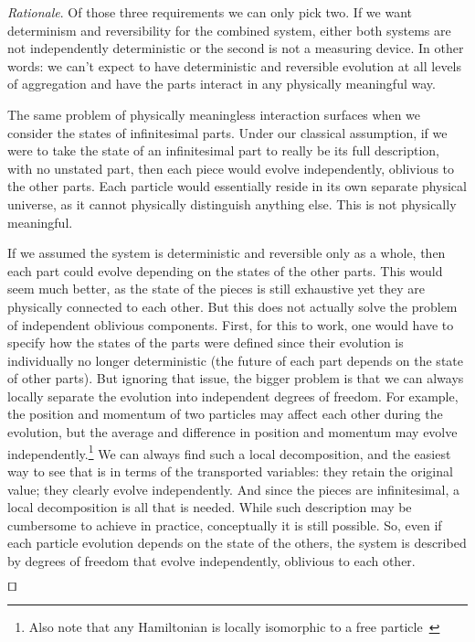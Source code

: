 \documentclass[smallextended]{svjour3}
\numberwithin{equation}{section}
\newenvironment{rationale}{\emph{Rationale}.}{\hfill\(\qed\)}
\theoremstyle{definition}
\newenvironment{rationale}{\emph{Rationale}.}{\qed}
\begin{document}
\begin{rationale}
	Of those three requirements we can only pick two. If we want determinism and reversibility for the combined system, either both systems are not independently deterministic or the second is not a measuring device. In other words: we can't expect to have deterministic and reversible evolution at all levels of aggregation and have the parts interact in any physically meaningful way.
	
	The same problem of physically meaningless interaction surfaces when we consider the states of infinitesimal parts. Under our classical assumption, if we were to take the state of an infinitesimal part to really be its full description, with no unstated part, then each piece would evolve independently, oblivious to the other parts. Each particle would essentially reside in its own separate physical universe, as it cannot physically distinguish anything else. This is not physically meaningful.
	
	If we assumed the system is deterministic and reversible only as a whole, then each part could evolve depending on the states of the other parts. This would seem much better, as the state of the pieces is still exhaustive yet they are physically connected to each other. But this does not actually solve the problem of independent oblivious components. First, for this to work, one would have to specify how the states of the parts were defined since their evolution is individually no longer deterministic (the future of each part depends on the state of other parts). But ignoring that issue, the bigger problem is that we can always locally separate the evolution into independent degrees of freedom. For example, the position and momentum of two particles may affect each other during the evolution, but the average and difference in position and momentum may evolve independently.\footnote{Also note that any Hamiltonian is locally isomorphic to a free particle~\cite{Linares}} We can always find such a local decomposition, and the easiest way to see that is in terms of the transported variables: they retain the original value; they clearly evolve independently. And since the pieces are infinitesimal, a local decomposition is all that is needed. While such description may be cumbersome to achieve in practice, conceptually it is still possible. So, even if each particle evolution depends on the state of the others, the system is described by degrees of freedom that evolve independently, oblivious to each other.	
	

\end{rationale}
\end{document}
